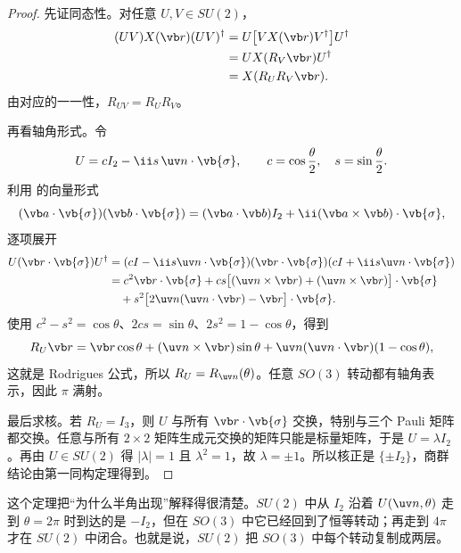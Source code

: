 \begin{proof}
先证同态性。对任意 $U,V\in SU(2)$，
\begin{align*}
(UV)X(\vb r)(UV)^\dagger
&=U\bigl[VX(\vb r)V^\dagger\bigr]U^\dagger\\
&=U X(R_V\vb r)U^\dagger\\
&=X(R_U R_V\vb r).
\end{align*}
由对应的一一性，$R_{UV}=R_U R_V$。

再看轴角形式。令
\[
U=cI_2-\ii s\,\uv n\cdot\vb{\sigma},
\qquad
c=\cos\frac\theta2,\quad s=\sin\frac\theta2.
\]
利用  的向量形式
\[
(\vb a\cdot\vb{\sigma})(\vb b\cdot\vb{\sigma})
=(\vb a\cdot\vb b)I_2
+\ii(\vb a\times\vb b)\cdot\vb{\sigma},
\]
逐项展开
\begin{align*}
U(\vb r\cdot\vb{\sigma})U^\dagger
&=(cI-\ii s\uv n\cdot\vb{\sigma})
(\vb r\cdot\vb{\sigma})
(cI+\ii s\uv n\cdot\vb{\sigma})\\
&=c^2\vb r\cdot\vb{\sigma}
+cs\bigl[(\uv n\times\vb r)+(\uv n\times\vb r)\bigr]\cdot\vb{\sigma}\\
&\quad+s^2\bigl[2\uv n(\uv n\cdot\vb r)-\vb r\bigr]\cdot\vb{\sigma}.
\end{align*}
使用 $c^2-s^2=\cos\theta$、$2cs=\sin\theta$、$2s^2=1-\cos\theta$，得到
\[
R_U\vb r
=\vb r\cos\theta
 +(\uv n\times\vb r)\sin\theta
 +\uv n(\uv n\cdot\vb r)(1-\cos\theta),
\]
这就是 Rodrigues 公式，所以 $R_U=R_{\uv n}(\theta)$。任意 $SO(3)$ 转动都有轴角表示，因此 $\pi$ 满射。

最后求核。若 $R_U=I_3$，则 $U$ 与所有 $\vb r\cdot\vb{\sigma}$ 交换，特别与三个 Pauli 矩阵都交换。任意与所有 $2\times2$ 矩阵生成元交换的矩阵只能是标量矩阵，于是 $U=\lambda I_2$。再由 $U\in SU(2)$ 得 $|\lambda|=1$ 且 $\lambda^2=1$，故 $\lambda=\pm1$。所以核正是 $\{\pm I_2\}$，商群结论由第一同构定理得到。
\end{proof}

这个定理把“为什么半角出现”解释得很清楚。$SU(2)$ 中从 $I_2$ 沿着 $U(\uv n,\theta)$ 走到 $\theta=2\pi$ 时到达的是 $-I_2$，但在 $SO(3)$ 中它已经回到了恒等转动；再走到 $4\pi$ 才在 $SU(2)$ 中闭合。也就是说，$SU(2)$ 把 $SO(3)$ 中每个转动复制成两层。

